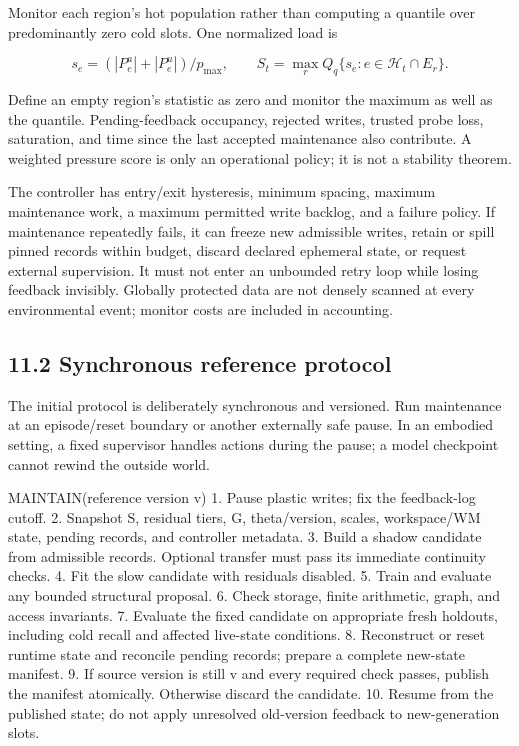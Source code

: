 \documentclass[
  11pt,
  a4paper,
]{article}
\newenvironment{Shaded}{}{}
\newcommand{\NormalTok}[1]{#1}
\begin{document}
Monitor each region's hot population rather than computing a quantile
over predominantly zero cold slots. One normalized load is

\[
s_e=(|P_e^a|+|P_e^u|)/p_{\max},\qquad
S_t=\max_r Q_q\{s_e:e\in\mathcal H_t\cap E_r\}.
\tag{31}
\]

Define an empty region's statistic as zero and monitor the maximum as
well as the quantile. Pending-feedback occupancy, rejected writes,
trusted probe loss, saturation, and time since the last accepted
maintenance also contribute. A weighted pressure score is only an
operational policy; it is not a stability theorem.

The controller has entry/exit hysteresis, minimum spacing, maximum
maintenance work, a maximum permitted write backlog, and a failure
policy. If maintenance repeatedly fails, it can freeze new admissible
writes, retain or spill pinned records within budget, discard declared
ephemeral state, or request external supervision. It must not enter an
unbounded retry loop while losing feedback invisibly. Globally protected
data are not densely scanned at every environmental event; monitor costs
are included in accounting.

\subsection{11.2 Synchronous reference
protocol}\label{synchronous-reference-protocol}

The initial protocol is deliberately synchronous and versioned. Run
maintenance at an episode/reset boundary or another externally safe
pause. In an embodied setting, a fixed supervisor handles actions during
the pause; a model checkpoint cannot rewind the outside world.

\begin{Shaded}
\begin{Highlighting}[]
\NormalTok{MAINTAIN(reference version v)}
\NormalTok{  1. Pause plastic writes; fix the feedback{-}log cutoff.}
\NormalTok{  2. Snapshot S, residual tiers, G, theta/version, scales,}
\NormalTok{     workspace/WM state, pending records, and controller metadata.}
\NormalTok{  3. Build a shadow candidate from admissible records.}
\NormalTok{     Optional transfer must pass its immediate continuity checks.}
\NormalTok{  4. Fit the slow candidate with residuals disabled.}
\NormalTok{  5. Train and evaluate any bounded structural proposal.}
\NormalTok{  6. Check storage, finite arithmetic, graph, and access invariants.}
\NormalTok{  7. Evaluate the fixed candidate on appropriate fresh holdouts,}
\NormalTok{     including cold recall and affected live{-}state conditions.}
\NormalTok{  8. Reconstruct or reset runtime state and reconcile pending}
\NormalTok{     records; prepare a complete new{-}state manifest.}
\NormalTok{  9. If source version is still v and every required check passes,}
\NormalTok{     publish the manifest atomically. Otherwise discard the candidate.}
\NormalTok{ 10. Resume from the published state; do not apply unresolved}
\NormalTok{     old{-}version feedback to new{-}generation slots.}
\end{Highlighting}
\end{Shaded}
\end{document}
